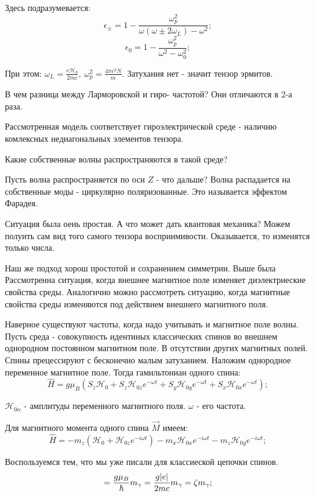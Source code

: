 \documentclass[a4paper, 14pt, russian]{article}
\newcommand{\be}{\begin{equation}}
\newcommand{\ee}{\end{equation}}
\begin{document}
	Здесь подразумевается:
	\be
		\epsilon_\pm = 1 - \frac{\omega_p^2}{\omega(\omega \pm 2 \omega_L) - \omega^2};
	\ee
	\be
		\epsilon_0 = 1 - \frac{\omega_p^2}{\omega^2 - \omega_0^2};
	\ee

	При этом: $\omega_L = \frac{e \mathcal{H}_0}{2mc},~\omega_p^2  = \frac{4\pi e^2 N}{m}$. Затухания нет - значит тензор эрмитов.

	В чем разница между Ларморовской и гиро- частотой? Они отличаются в 2-а раза.

	Рассмотренная модель соответствует гироэлектрической среде - наличию комлексных
	недиагональных элементов тензора.

	Какие собственные волны распространяются в такой среде?

	Пусть волна распространяется по оси $Z$ - что дальше? Волна распадается
	на собственные моды - циркулярно поляризованные. Это называется эффектом
	Фарадея.

	Ситуация была оень простая. А что может дать квантовая механика?
	Можем полуить сам вид того самого тензора восприимивости.
	Оказывается, то изменятся только числа. 

	Наш же подход хорош простотой и сохранением симметрии. Выше была Рассмотренна ситуация, когда внешнее магнитное поле изменяет
	диэлектриеские свойства среды. Аналогично можно рассмотреть ситуацию, когда магнитные свойства среды изменяются под действием внешнего магнитного поля.

	Наверное существуют частоты, когда надо учитывать и магнитное поле волны.
	Пусть среда - совокупность идентиных классических спинов во внешнем однородном
	постоянном магнитном поле. В отсутствии других магнитных полей. Спины прецессируют
	с бесконечно малым затуханием. Наложим однородное переменное магнитное поле. Тогда гамильтониан одного спина:
	\be
		\label{eq177}
		\hat{H} = g \mu_B (S_z \mathcal{H}_0 + S_z \mathcal{H}_{0z} e^{-\omega t}
			+ S_y \mathcal{H}_{0y} e^{-\omega t} + S_x \mathcal{H}_{0x} e^{-\omega t});
	\ee

	$\mathcal{H}_{0\alpha}$ - амплитуды переменного магнитного поля. $\omega$ - его частота.

	Для магнитного момента одного спина $\vec M$ имеем:
	\be
		\label{eq178}
		\hat{H} = - m_z (\mathcal{H}_0 + \mathcal{H}_{0z}e^{-i\omega t})
		- m_x \mathcal{H}_{0x}e^{-i\omega t} - m_z \mathcal{H}_{0y}e^{-i\omega t};
	\ee

	Воспользуемся тем, что мы уже писали для классиеской цепочки спинов.
	\be
		[m_\alpha; m_\beta] = \frac{g\mu_B}{\hbar} m_\gamma = 
			\frac{g\abs{e}}{2mc} m_\gamma = \zeta m_\gamma;
	\ee
\end{document}
